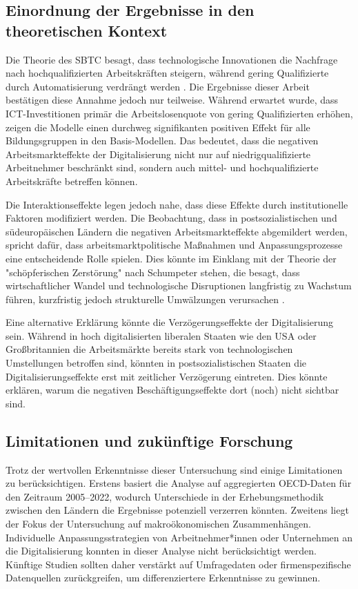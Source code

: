 \subsection{Einordnung der Ergebnisse in den theoretischen Kontext}

Die Theorie des \ac{SBTC} besagt, dass technologische Innovationen die Nachfrage nach 
hochqualifizierten Arbeitskräften steigern, während gering Qualifizierte durch 
Automatisierung verdrängt werden \parencite[vgl.][S. 7]{acemoglu2002technical}. Die Ergebnisse 
dieser Arbeit bestätigen diese Annahme jedoch nur teilweise. Während erwartet wurde, dass 
\ac{ICT}-Investitionen primär die Arbeitslosenquote von gering Qualifizierten erhöhen, 
zeigen die Modelle einen durchweg signifikanten positiven Effekt für alle Bildungsgruppen in 
den Basis-Modellen. Das bedeutet, dass die negativen Arbeitsmarkteffekte der Digitalisierung 
nicht nur auf niedrigqualifizierte Arbeitnehmer beschränkt sind, sondern auch mittel- und 
hochqualifizierte Arbeitskräfte betreffen können.

Die Interaktionseffekte legen jedoch nahe, dass diese Effekte durch institutionelle Faktoren 
modifiziert werden. Die Beobachtung, dass in postsozialistischen und südeuropäischen Ländern 
die negativen Arbeitsmarkteffekte abgemildert werden, spricht dafür, dass arbeitsmarktpolitische 
Maßnahmen und Anpassungsprozesse eine entscheidende Rolle spielen. Dies könnte im Einklang mit 
der Theorie der "schöpferischen Zerstörung" nach Schumpeter stehen, die besagt, dass wirtschaftlicher 
Wandel und technologische Disruptionen langfristig zu Wachstum führen, kurzfristig jedoch strukturelle 
Umwälzungen verursachen \parencite[vgl.][S. 103-105]{schumpeter1976capitalism}.

Eine alternative Erklärung könnte die Verzögerungseffekte der Digitalisierung sein. Während in 
hoch digitalisierten liberalen Staaten wie den USA oder Großbritannien die Arbeitsmärkte bereits 
stark von technologischen Umstellungen betroffen sind, könnten in postsozialistischen Staaten 
die Digitalisierungseffekte erst mit zeitlicher Verzögerung eintreten. Dies könnte erklären, warum 
die negativen Beschäftigungseffekte dort (noch) nicht sichtbar sind.

\subsection{Limitationen und zukünftige Forschung}

Trotz der wertvollen Erkenntnisse dieser Untersuchung sind einige Limitationen zu 
berücksichtigen. Erstens basiert die Analyse auf aggregierten \ac{OECD}-Daten für den 
Zeitraum 2005–2022, wodurch Unterschiede in der Erhebungsmethodik zwischen den 
Ländern die Ergebnisse potenziell verzerren könnten. Zweitens liegt der Fokus der 
Untersuchung auf makroökonomischen Zusammenhängen. Individuelle Anpassungsstrategien 
von Arbeitnehmer*innen oder Unternehmen an die Digitalisierung konnten in dieser 
Analyse nicht berücksichtigt werden. Künftige Studien sollten daher verstärkt auf 
Umfragedaten oder firmenspezifische Datenquellen zurückgreifen, um differenziertere 
Erkenntnisse zu gewinnen.

